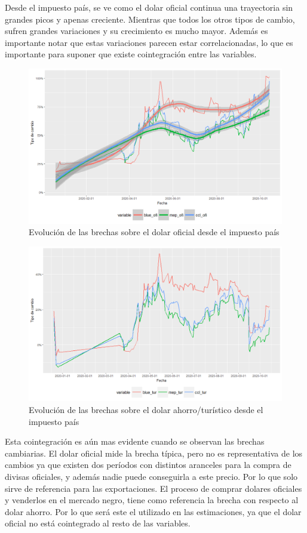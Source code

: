 \documentclass[11pt,a4paper]{article}
\begin{document}
Desde el impuesto país, se ve como el dolar oficial continua una trayectoria sin grandes picos y apenas creciente. Mientras que todos los otros tipos de cambio, sufren grandes variaciones y su crecimiento es mucho mayor. Además es importante notar que estas variaciones parecen estar correlacionadas, lo que es importante para suponer que existe cointegración entre las variables. 
\begin{figure}[H]
\includegraphics[scale=0.45]{3}
\centering
\caption{Evolución de las brechas sobre el dolar oficial desde el impuesto país}
\end{figure} 

\begin{figure}[H]
\includegraphics[scale=0.45]{4}
\centering
\caption{Evolución de las brechas sobre el dolar ahorro/turístico desde el impuesto país}
\end{figure} 

Esta cointegración es aún mas evidente cuando se observan las brechas cambiarias. El dolar oficial mide la brecha típica, pero no es representativa de los cambios ya que existen dos períodos con distintos aranceles para la compra de divisas oficiales, y además nadie puede conseguirla a este precio. Por lo que solo sirve de referencia para las exportaciones. El proceso de comprar dolares oficiales y venderlos en el mercado negro, tiene como referencia la brecha con respecto al dolar ahorro. Por lo que será este el utilizado en las estimaciones, ya que el dolar oficial no está cointegrado al resto de las variables.
\end{document}
